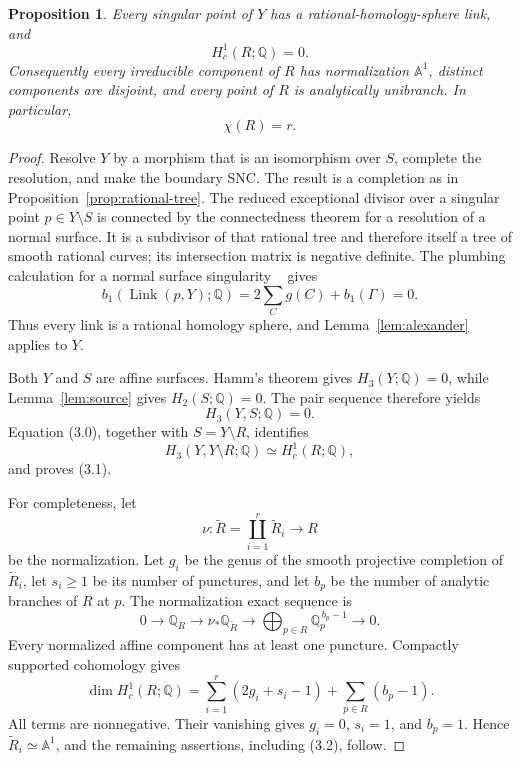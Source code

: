 \documentclass[11pt]{article}
\newtheorem{proposition}[theorem]{Proposition}
\theoremstyle{definition}
\theoremstyle{remark}
\newcommand{\A}{\mathbb A}
\newcommand{\Q}{\mathbb Q}
\begin{document}
\begin{proposition}\label{prop:boundary-cohomology}
Every singular point of \(Y\) has a rational-homology-sphere link, and
\[
 H_c^1(R;\Q)=0.
 \tag{3.1}
\]
Consequently every irreducible component of \(R\) has normalization
\(\A^1\), distinct components are disjoint, and every point of \(R\)
is analytically unibranch.  In particular,
\[
 \chi(R)=r.
 \tag{3.2}
\]
\end{proposition}

\begin{proof}
Resolve \(Y\) by a morphism that is an isomorphism over \(S\), complete
the resolution, and make the boundary SNC.  The result is a completion
as in Proposition~\ref{prop:rational-tree}.  The reduced exceptional
divisor over a singular point \(p\in Y\setminus S\) is connected by
the connectedness theorem for a resolution of a normal surface.  It is
a subdivisor of that rational tree and therefore itself a tree of
smooth rational curves; its intersection matrix is negative definite.
The plumbing calculation for a normal surface singularity
~\cite{Mumford} gives
\[
 b_1(\operatorname{Link}(p,Y);\Q)
 =2\sum_C g(C)+b_1(\Gamma)=0.
\]
Thus every link is a rational homology sphere, and
Lemma~\ref{lem:alexander} applies to \(Y\).

Both \(Y\) and \(S\) are affine surfaces.  Hamm's theorem gives
\(H_3(Y;\Q)=0\), while Lemma~\ref{lem:source} gives
\(H_2(S;\Q)=0\).  The pair sequence therefore yields
\[
 H_3(Y,S;\Q)=0.
\]
Equation (3.0), together with \(S=Y\setminus R\), identifies
\[
 H_3(Y,Y\setminus R;\Q)\simeq H_c^1(R;\Q),
\]
and proves (3.1).

For completeness, let
\[
 \nu:\widetilde R=\coprod_{i=1}^r\widetilde R_i\longrightarrow R
\]
be the normalization.  Let \(g_i\) be the genus of the smooth
projective completion of \(\widetilde R_i\), let \(s_i\ge1\) be its
number of punctures, and let \(b_p\) be the number of analytic branches
of \(R\) at \(p\).  The normalization exact sequence is
\[
0\longrightarrow\Q_R\longrightarrow\nu_*\Q_{\widetilde R}
\longrightarrow
\bigoplus_{p\in R}\Q_p^{\,b_p-1}\longrightarrow0.
\]
Every normalized affine component has at least one puncture.
Compactly supported cohomology gives
\[
 \dim H_c^1(R;\Q)
 =\sum_{i=1}^r(2g_i+s_i-1)
  +\sum_{p\in R}(b_p-1).
 \tag{3.3}
\]
All terms are nonnegative.  Their vanishing gives
\(g_i=0\), \(s_i=1\), and \(b_p=1\).  Hence
\(\widetilde R_i\simeq\A^1\), and the remaining assertions, including
(3.2), follow.
\end{proof}
\end{document}
